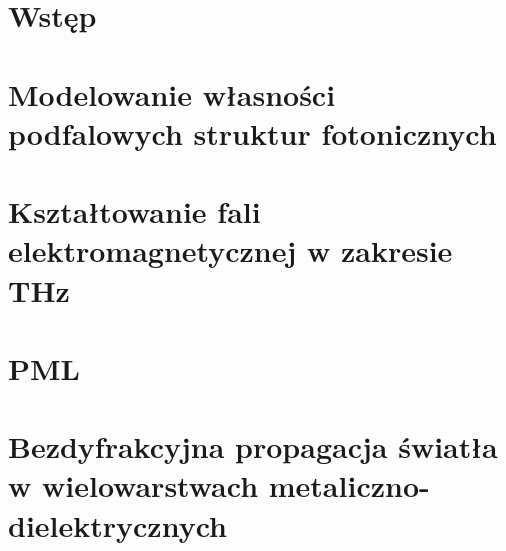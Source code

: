 \documentclass[pdflatex,11pt]{aghdpl}
\author{Marcin Stolarek}
\date{2014}
\begin{document}
\titlepages

\tableofcontents
\clearpage

\chapter{Wstęp}



\chapter{Modelowanie własności podfalowych struktur fotonicznych}


\chapter{Kształtowanie fali elektromagnetycznej w zakresie THz }



\chapter{PML}


\chapter{Bezdyfrakcyjna propagacja światła w wielowarstwach metaliczno-dielektrycznych}








\end{document}

